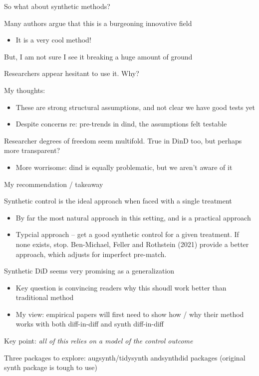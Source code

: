 \documentclass[notes,11pt, aspectratio=169]{beamer}
\newenvironment{wideitemize}{\itemize\addtolength{\itemsep}{10pt}}{\enditemize}
\begin{document}
\begin{frame}{So what about synthetic methods?}
  \begin{wideitemize}
  \item Many authors argue that this is a burgeoning innovative field
    \begin{itemize}
    \item It is a very cool method!
    \end{itemize}
  \item But, I am not sure I see it breaking a huge amount of ground
  \item Researchers appear hesitant to use it. Why?
  \item  My thoughts:
    \begin{itemize}
    \item These are strong structural assumptions, and not clear we
      have good tests yet
    \item Despite concerns re: pre-trends in dind, the assumptions
      felt testable
    \end{itemize}
  \item Researcher degrees of freedom seem multifold. True in DinD
    too, but perhaps more transparent?
    \begin{itemize}
    \item More worrisome: dind is equally problematic, but we aren't
      aware of it
    \end{itemize}
  \end{wideitemize}
\end{frame}



\begin{frame}{My recommendation / takeaway}
  \begin{wideitemize}
  \item Synthetic control is the ideal approach when faced with a single treatment
    \begin{itemize}
    \item By far the most natural approach in this setting, and is a practical approach
    \item Typcial approach -- get a good synthetic control for a given
      treatment. If none exists, stop. Ben-Michael, Feller and
      Rothstein (2021) provide a better approach, which adjusts for
      imperfect pre-match.
    \end{itemize}
  \item Synthetic DiD seems very promising as a generalization
    \begin{itemize}
    \item Key question is convincing readers why this shoudl work better than traditional method
    \item My view: empirical papers will first need to show how / why
      their method works with both diff-in-diff and synth diff-in-diff
    \end{itemize}
  \item Key point: \emph{all of this relies on a model of the control outcome}
  \item Three packages to explore: augsynth/tidysynth andsynthdid
    packages (original synth package is tough to use)
  \end{wideitemize}
\end{frame}
\end{document}
